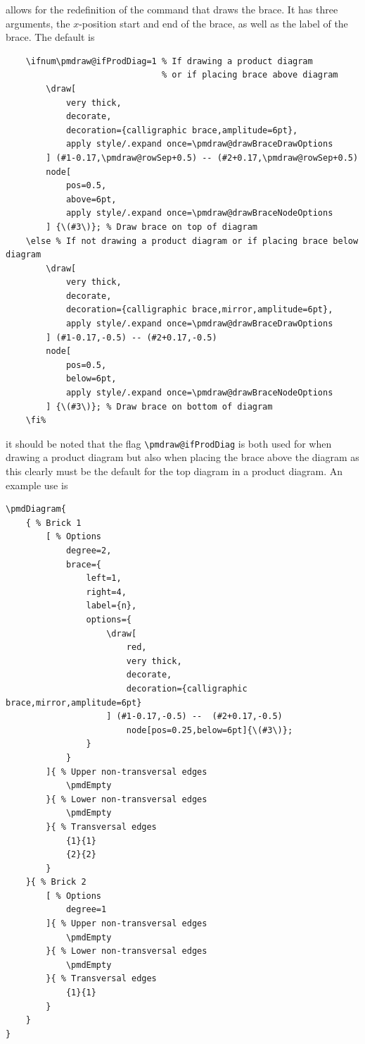 \documentclass{ltxdoc}
\begin{document}
allows for the redefinition of the command that draws the brace. It has three arguments, the \( x \)-position start and end of the brace, as well as the label of the brace. The default is
\begin{verbatim}
    \ifnum\pmdraw@ifProdDiag=1 % If drawing a product diagram 
                               % or if placing brace above diagram
        \draw[
            very thick,
            decorate,
            decoration={calligraphic brace,amplitude=6pt},
            apply style/.expand once=\pmdraw@drawBraceDrawOptions
        ] (#1-0.17,\pmdraw@rowSep+0.5) -- (#2+0.17,\pmdraw@rowSep+0.5) 
        node[
            pos=0.5,
            above=6pt,
            apply style/.expand once=\pmdraw@drawBraceNodeOptions
        ] {\(#3\)}; % Draw brace on top of diagram
    \else % If not drawing a product diagram or if placing brace below diagram
        \draw[
            very thick,
            decorate,
            decoration={calligraphic brace,mirror,amplitude=6pt},
            apply style/.expand once=\pmdraw@drawBraceDrawOptions
        ] (#1-0.17,-0.5) -- (#2+0.17,-0.5) 
        node[
            pos=0.5,
            below=6pt,
            apply style/.expand once=\pmdraw@drawBraceNodeOptions
        ] {\(#3\)}; % Draw brace on bottom of diagram
    \fi%
\end{verbatim}
it should be noted that the flag \verb`\pmdraw@ifProdDiag` is both used for when drawing a product diagram but also when placing the brace above the diagram as this clearly must be the default for the top diagram in a product diagram.
An example use is
\begin{center}
    \begin{minipage}{\dimexpr0.85\textwidth-2\fboxrule-2\fboxsep\relax}
        \begin{minipage}[c]{0.4\linewidth}
\begin{verbatim}
\pmdDiagram{
    { % Brick 1
        [ % Options
            degree=2,
            brace={
                left=1,
                right=4,
                label={n},
                options={
                    \draw[
                        red,
                        very thick,
                        decorate,
                        decoration={calligraphic brace,mirror,amplitude=6pt}
                    ] (#1-0.17,-0.5) --  (#2+0.17,-0.5)
                        node[pos=0.25,below=6pt]{\(#3\)};
                }
            }
        ]{ % Upper non-transversal edges
            \pmdEmpty
        }{ % Lower non-transversal edges
            \pmdEmpty
        }{ % Transversal edges
            {1}{1}
            {2}{2}
        }
    }{ % Brick 2
        [ % Options
            degree=1
        ]{ % Upper non-transversal edges
            \pmdEmpty
        }{ % Lower non-transversal edges
            \pmdEmpty
        }{ % Transversal edges
            {1}{1}
        }
    }
}
\end{verbatim}
        \end{minipage}
        \hfill
        \begin{minipage}[c]{0.4\linewidth}
        \end{minipage}
    \end{minipage}%
\end{center}
\end{document}

